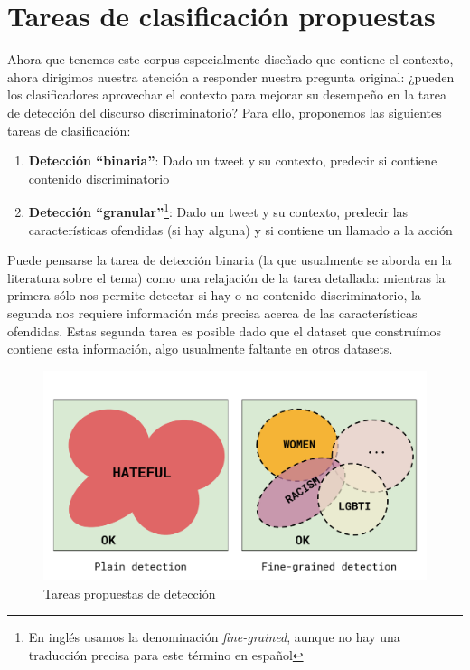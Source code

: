 \section{Tareas de clasificación propuestas}



Ahora que tenemos este corpus especialmente diseñado que contiene el contexto, ahora dirigimos nuestra atención a responder nuestra pregunta original: ¿pueden los clasificadores aprovechar el contexto para mejorar su desempeño en la tarea de detección del discurso discriminatorio? Para ello, proponemos las siguientes tareas de clasificación:

\begin{enumerate}
    \item \textbf{Detección ``binaria''}: Dado un tweet y su contexto, predecir si contiene contenido discriminatorio
    \item \textbf{Detección ``granular''}\footnote{En inglés usamos la denominación \emph{fine-grained}, aunque no hay una traducción precisa para este término en español}: Dado un tweet y su contexto, predecir las características ofendidas (si hay alguna) y si contiene un llamado a la acción
\end{enumerate}


Puede pensarse la tarea de detección binaria (la que usualmente se aborda en la literatura sobre el tema) como una relajación de la tarea detallada: mientras la primera sólo nos permite detectar si hay o no contenido discriminatorio, la segunda nos requiere información más precisa acerca de las características ofendidas. Estas segunda tarea es posible dado que el dataset que construímos contiene esta información, algo usualmente faltante en otros datasets.


\begin{figure}[t]
    \centering
    \includegraphics[width=\textwidth]{img/hate_detection_tasks.pdf}
    \caption{Tareas propuestas de detección}
    \label{fig:hate_detection_tasks}
\end{figure}

